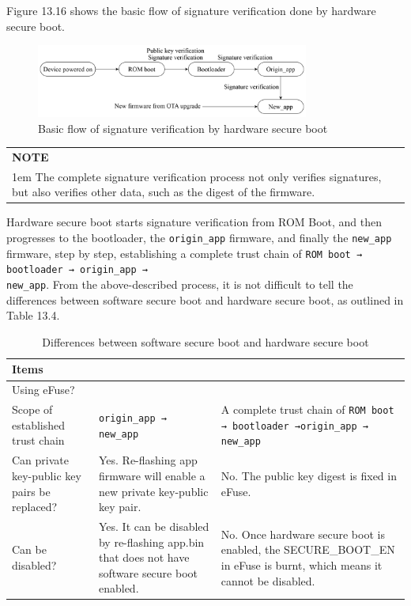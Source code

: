 \documentclass[a4paper,12pt,openany]{book}
\renewcommand{\arraystretch}{1}
\newcommand{\note}[2][NOTE]{ %
\vspace{6pt}
\begin{tabular}{b{\textwidth}}
\hline
\fontfamily{phv}\selectfont \textbf{#1}\\
\leftskip 1em #2\\
\hline
\end{tabular}
}
\begin{document}
Figure 13.16 shows the basic flow of signature verification done by hardware secure boot.

\begin{figure}[!h]
    \centering
    \includegraphics[width=0.8\textwidth]{D13Z/13-16}
    \caption{Basic flow of signature verification by hardware secure boot}
\end{figure}

\note{The complete signature verification process not only verifies signatures, but also verifies other data, such as the digest of the firmware.}

Hardware secure boot starts signature verification from ROM Boot, and then progresses to the bootloader, the \verb|origin_app| firmware, and finally the \verb|new_app| firmware, step by step, establishing a complete trust chain of \verb|ROM boot → bootloader → origin_app → |\\ \verb|new_app|. From the above-described process, it is not difficult to tell the differences between software secure boot and hardware secure boot, as outlined in Table 13.4.

\begin{table}[h!]
    \renewcommand{\arraystretch}{1.4}
    \caption{Differences between software secure boot and hardware secure boot}
    \begin{tabular}{|>{\Centering}m{10em}|>{\RaggedRight}m{13em}|>{\RaggedRight}m{15em}|}
        \hline
        \rowcolor{LightBlue} \textbf{Items}&\multicolumn{1}{c|}{\textbf{Software Secure Boot}}&\multicolumn{1}{c|}{\textbf{Hardware Secure Boot}}\\
        \hline
        Using eFuse?&\multicolumn{1}{c|}{No.}&\multicolumn{1}{c|}{Yes.}\\
        \hline
        Scope of established trust chain&\verb|origin_app → new_app|&A complete trust chain of \verb|ROM boot → bootloader →|\newline \verb|origin_app → new_app|\\
        \hline
        Can private key-public key pairs be replaced?&Yes. Re-flashing app firmware will enable a new private key-public key pair.&No. The public key digest is fixed in eFuse.\\
        \hline
        Can be disabled?&Yes. It can be disabled by re-flashing app.bin that does not have software secure boot enabled.&No. Once hardware secure boot is enabled, the SECURE\_BOOT\_EN in eFuse is burnt, which means it cannot be disabled.\\
        \hline
    \end{tabular}
\end{table}
\end{document}
